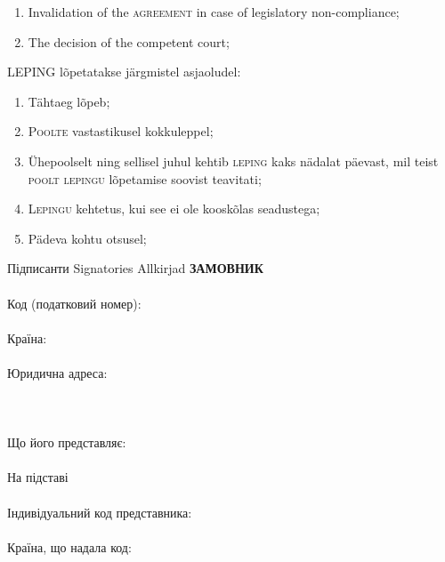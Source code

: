\begin{Form}
\begin{paracol}{3}
{\begin{enumerate}
          \item Invalidation of the \textsc{agreement} in case of legislatory non-compliance;
          \item The decision of the competent court; 
        \end{enumerate} }
        {LEPING lõpetatakse järgmistel asjaoludel:
        \begin{enumerate}
          \item Tähtaeg lõpeb;\\
          \item P\textsc{oolte} vastastikusel kokkuleppel;\\
          \item Ühepoolselt ning sellisel juhul kehtib \textsc{leping} kaks nädalat päevast, mil teist \textsc{poolt lepingu} lõpetamise soovist teavitati;\\
          \item L\textsc{epingu} kehtetus, kui see ei ole kooskõlas seadustega;\\
          \item Pädeva kohtu otsusel;\\
        \end{enumerate}
        }
      \clausenewpage
        {Підписанти}
        {Signatories}
        {Allkirjad}
        {\textbf{ЗАМОВНИК}\\
        \\
        Код (податковий номер):\\
        \\
        Країна:\\
        \\
        Юридична адреса:\\
        \\
        \\
        \\
        Що його представляє:\\
        \\
        На підставі\\
        \\
        Індивідуальний код представника:\\
        \\
        Країна, що надала код:\\
        \\
}
\end{paracol}
\end{Form}
